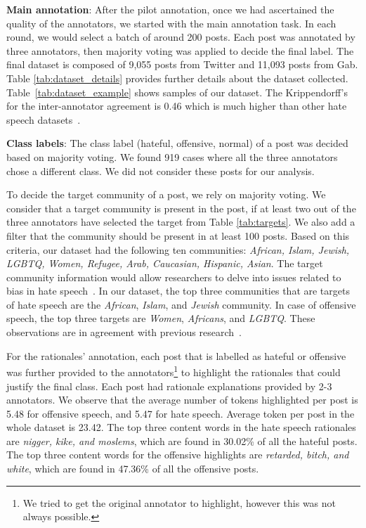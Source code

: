 \documentclass[letterpaper]{article} \usepackage{aaai21}  \usepackage{times}  \usepackage{helvet} \usepackage{courier}  \usepackage[hyphens]{url}  \usepackage{graphicx} \urlstyle{rm} \def\UrlFont{\rm}  \usepackage{natbib}  \usepackage{caption}
\begin{document}
\noindent\textbf{Main annotation}: After the pilot annotation, once we had ascertained the quality of the annotators, we started with the main annotation task. In each round, we would select a batch of around 200 posts. Each post was annotated by three annotators, then majority voting was applied to decide the final label. The final dataset is composed of 9,055 posts from Twitter and 11,093 posts from Gab. Table \ref{tab:dataset_details} provides further details about the dataset collected. Table~\ref{tab:dataset_example} shows samples of our dataset. The Krippendorff's  for the inter-annotator agreement is 0.46 which is much higher than other hate speech datasets~\cite{del2017hate,ousidhoum2019multilingual}.



\noindent\textbf{Class labels}: The class label (hateful, offensive, normal) of a post was decided based on majority voting. We found 919 cases where all the three annotators chose a different class. We did not consider these posts for our analysis. 

To decide the target community of a post, we rely on majority voting. We consider that a target community is present in the post, if at least two out of the three annotators have selected the target from Table \ref{tab:targets}. We also add a filter that the community should be present in at least 100 posts. Based on this criteria, our dataset had the following ten communities: \textit{African, Islam, Jewish, LGBTQ, Women, Refugee, Arab, Caucasian, Hispanic, Asian}. The target community information would allow researchers to delve into issues related to bias in hate speech~\cite{davidson2019racial}. In our dataset, the top three communities that are targets of hate speech are the \textit{African}, \textit{Islam}, and \textit{Jewish} community. In case of offensive speech, the top three targets are \textit{Women}, \textit{Africans}, and \textit{LGBTQ}. These observations are in agreement with previous research~\cite{silva2016analyzing}.

For the rationales' annotation, each post that is labelled as hateful or offensive was further provided to the annotators\footnote{We tried to get the original annotator to highlight, however this was not always possible.} to highlight the rationales that could justify the final class. Each post had rationale explanations provided by 2-3 annotators. We observe that the average number of tokens highlighted per post is 5.48 for offensive speech, and 5.47 for hate speech. Average token per post in the whole dataset is 23.42. The top three content words in the hate speech rationales are \textit{nigger, kike, and moslems}, which are found in 30.02\% of all the hateful posts. The top three content words for the offensive highlights are \textit{retarded, bitch, and white}, which are found in 47.36\% of all the offensive posts. 
\end{document}
